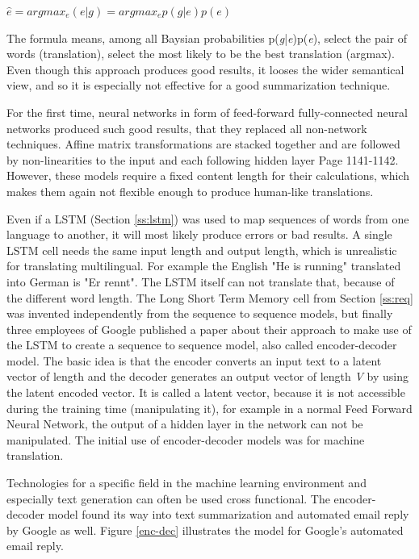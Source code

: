 \begin{center}
\begin{math}
\hat{e} = argmax_{e}(e|g) = argmax_{e} p(g|e) p(e)
\label{eq:rule}
\end{math}
\end{center}

The formula means, among all Baysian probabilities p(\textit{g}|\textit{e})p(\textit{e}), select the pair of words (translation), select the most likely to be the best translation (argmax). Even though this approach produces good results, it looses the wider semantical view, and so it is especially not effective for a good summarization technique.

For the first time, neural networks in form of feed-forward fully-connected neural networks produced such good results, that they replaced all non-network techniques. Affine matrix transformations are stacked together and are followed by non-linearities to the input and each following hidden layer \cite{Bengio} Page 1141-1142. However, these models require a fixed content length for their calculations, which makes them again not flexible enough to produce human-like translations. 

Even if a LSTM (Section \ref{ss:lstm}) was used to map sequences of words from one language to another, it will most likely produce errors or bad results. A single LSTM cell needs the same input length and output length, which is unrealistic for translating multilingual. For example the English "He is running" translated into German is "Er rennt". The LSTM itself can not translate that, because of the different word length. 
The Long Short Term Memory cell from Section \ref{ss:req} was invented independently from the sequence to sequence models, but
finally three employees of Google published a paper about their approach to make use of the LSTM to create a sequence to sequence model, also called encoder-decoder model.
The basic idea is that the encoder converts an input text to a latent vector of length  and the decoder generates an output vector of length \textit{V} by using the latent encoded vector. It is called a latent vector, because it is not accessible during the training time (manipulating it), for example in a normal Feed Forward Neural Network, the output of a hidden layer in the network can not be manipulated. The initial use of encoder-decoder models was for machine translation.

Technologies for a specific field in the machine learning environment and especially text generation can often be used cross functional. The encoder-decoder model found its way into text summarization and automated email reply by Google \cite{google} as well. Figure \ref{enc-dec} illustrates the model for Google's automated email reply.

